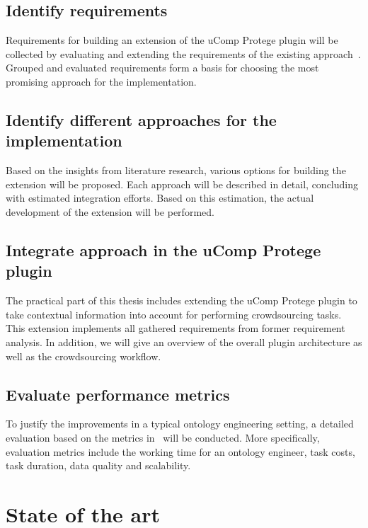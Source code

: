 \documentclass[12pt, notitlepage]{article}
\begin{document}
\subsection{Identify requirements}
Requirements for building an extension of the uComp Protege plugin will be collected by evaluating and extending the requirements of the existing approach~\cite{wohlgenannt2016crowd}. Grouped and evaluated requirements form a basis for choosing the most promising approach for the implementation.
\subsection{Identify different approaches for the implementation}
Based on the insights from literature research, various options for building the extension will be proposed. Each approach will be described in detail, concluding with estimated integration efforts. Based on this estimation, the actual development of the extension will be performed. 
\subsection{Integrate approach in the uComp Protege plugin}
The practical part of this thesis includes extending the uComp Protege plugin to take contextual information into account for performing crowdsourcing tasks. This extension implements all gathered requirements from former requirement analysis. In addition, we will give an overview of the overall plugin architecture as well as the crowdsourcing workflow. 
\subsection{Evaluate performance metrics}
To justify the improvements in a typical ontology engineering setting, a detailed evaluation based on the metrics in~\cite{wohlgenannt2016crowd} will be conducted. More specifically, evaluation metrics include the working time for an ontology engineer, task costs, task duration, data quality and scalability.  

\section{State of the art}
\end{document}
